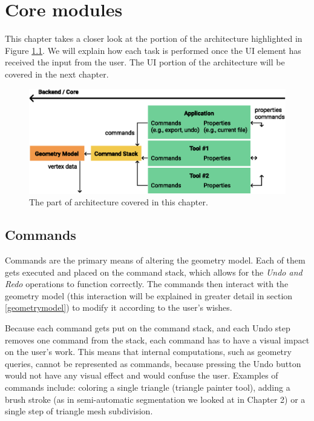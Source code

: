 \chapter{Core modules}

This chapter takes a closer look at the portion of the architecture highlighted in Figure \ref{fig:architecture_commandstack}. We will explain how each task is performed once the UI element has received the input from the user. The UI portion of the architecture will be covered in the next chapter.

\begin{figure}[h]
	\centering
	\includegraphics[scale=0.9]{images/architecture_core}
	\caption{The part of architecture covered in this chapter.}
	\label{fig:architecture_commandstack}
\end{figure}


\section{Commands}
Commands are the primary means of altering the geometry model. Each of them gets executed and placed on the command stack, which allows for the \textit{Undo and Redo} operations to function correctly. The commands then interact with the geometry model (this interaction will be explained in greater detail in section \ref{geometrymodel}) to modify it according to the user's wishes.

Because each command gets put on the command stack, and each Undo step removes one command from the stack, each command has to have a visual impact on the user's work. This means that internal computations, such as geometry queries, cannot be represented as commands, because pressing the Undo button would not have any visual effect and would confuse the user. Examples of commands include: coloring a single triangle (triangle painter tool), adding a brush stroke (as in semi-automatic segmentation we looked at in Chapter 2) or a single step of triangle mesh subdivision.

